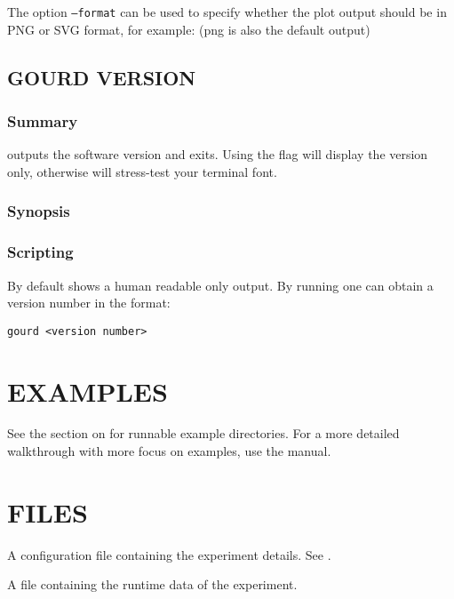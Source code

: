\documentclass[a4paper,english]{article}
\begin{document}
\begin{adjustwidth}{18pt}{0pt}
                The option \texttt{--format} can be used to specify whether the plot output
                should be in PNG or SVG format, for example: 
                    (png is also the default output)

        \subsection{GOURD VERSION}

            \subsubsection{Summary}
                  outputs the software version and exits.
                Using the  flag will display the version only, otherwise 
                will stress-test your terminal font.

            \subsubsection{Synopsis}
                  

            \subsubsection{Scripting}
                By default   shows a human readable only output. By
                running    one can obtain a version number
                in the format:

                \texttt{gourd <version number>}

    \section{EXAMPLES}

        See the section on   for runnable example directories.
        For a more detailed walkthrough with more focus on examples, use the  manual.

    \section{FILES}

        \begin{Description}[Files]\setlength{\itemsep}{0cm}
            \item[\File{gourd.toml}] A configuration file containing the experiment details. See .
            \item[\File{<experiment-dir>/<experiment-number>.lock}] A file containing the runtime data of the experiment.
        \end{Description}


\end{adjustwidth}
\end{document}
